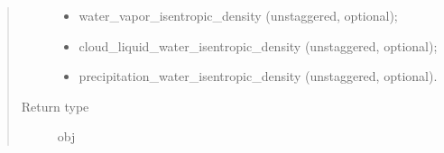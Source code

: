 \documentclass[letterpaper,10pt,english]{sphinxmanual}
\begin{document}
\begin{fulllineitems}
\begin{fulllineitems}
\begin{quote}
\begin{description}
\begin{itemize}
\item {} 
water\_vapor\_isentropic\_density (unstaggered, optional);

\item {} 
cloud\_liquid\_water\_isentropic\_density (unstaggered, optional);

\item {} 
precipitation\_water\_isentropic\_density (unstaggered, optional).

\end{itemize}


\item[{Return type}] \leavevmode
obj

\end{description}\end{quote}

\end{fulllineitems}


\end{fulllineitems}

\end{document}
